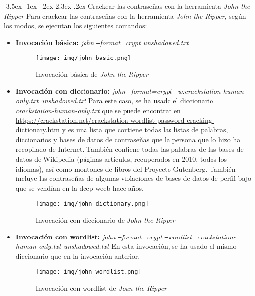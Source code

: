 \documentclass[11pt]{report}
\makeatletter
\renewcommand\chapter{\@startsection{chapter}{0}{\z@}%
    {-3.5ex \@plus -1ex \@minus -.2ex}%
    {2.3ex \@plus.2ex}%
    {\normalfont\Large\bfseries}}
\makeatother
\begin{document}
\chapter{Crackear las contraseñas con la herramienta \emph{John the Ripper}}
Para crackear las contraseñas con la herramienta \emph{John the Ripper}, según los modos, se ejecutan los
siguientes comandos:
\begin{itemize}
  \item \textbf{Invocación básica:} \emph{john \texttt{--}format=crypt unshadowed.txt}
  \begin{figure}[H]
    \centering
    \texttt{[image: img/john\_basic.png]}
    \caption{Invocación básica de \emph{John the Ripper}}
    \label{fig:invocación básica de john the ripper}
  \end{figure}

  \item \textbf{Invocación con diccionario:} \emph{john \texttt{--}format=crypt \texttt{-}w:crackstation-human-only.txt unshadowed.txt}
  Para este caso, se ha usado el diccionario \emph{crackstation-human-only.txt} que se puede encontrar en \url{https://crackstation.net/crackstation-wordlist-password-cracking-dictionary.htm}
  y es una lista que contiene todas las listas de palabras, diccionarios y bases de datos de contraseñas que la persona que lo hizo ha recopilado de Internet. También contiene todas las palabras
  de las bases de datos de Wikipedia (páginas-artículos, recuperados en 2010, todos los idiomas), así como montones de libros del Proyecto Gutenberg. También incluye las contraseñas de algunas 
  violaciones de bases de datos de perfil bajo que se vendían en la deep-weeb hace años.
  \begin{figure}[H]
    \centering
    \texttt{[image: img/john\_dictionary.png]}
    \caption{Invocación con diccionario de \emph{John the Ripper}}
    \label{fig:invocación con diccionario de john the ripper}
  \end{figure}

  \cleardoublepage

  \item \textbf{Invocación con wordlist:} \emph{john \texttt{--}format=crypt \texttt{--}wordlist=crackstation-human-only.txt unshadowed.txt}
  En esta invocación, se ha usado el mismo diccionario que en la invocación anterior.
  \begin{figure}[H]
    \centering
    \texttt{[image: img/john\_wordlist.png]}
    \caption{Invocación con wordlist de \emph{John the Ripper}}
    \label{fig:invocación con wordlist de john the ripper}
  \end{figure}


\end{itemize}
\end{document}
